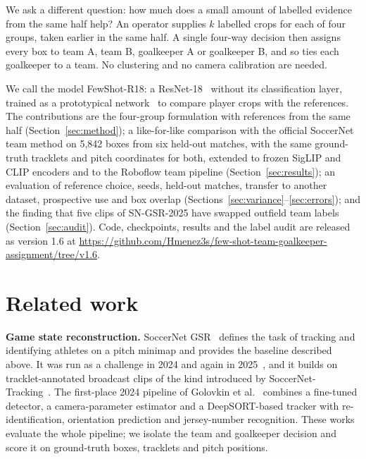 \documentclass[10pt]{article}
\begin{document}
We ask a different question: how much does a small amount of labelled evidence from the same half help? An operator supplies $k$ labelled crops for each of four groups, taken earlier in the same half. A single four-way decision then assigns every box to team A, team B, goalkeeper A or goalkeeper B, and so ties each goalkeeper to a team. No clustering and no camera calibration are needed.

We call the model FewShot-R18: a ResNet-18~\cite{he2016resnet} without its classification layer, trained as a prototypical network~\cite{snell2017prototypical} to compare player crops with the references. The contributions are the four-group formulation with references from the same half (Section~\ref{sec:method}); a like-for-like comparison with the official SoccerNet team method on 5,842 boxes from six held-out matches, with the same ground-truth tracklets and pitch coordinates for both, extended to frozen SigLIP and CLIP encoders and to the Roboflow team pipeline (Section~\ref{sec:results}); an evaluation of reference choice, seeds, held-out matches, transfer to another dataset, prospective use and box overlap (Sections~\ref{sec:variance}--\ref{sec:errors}); and the finding that five clips of SN-GSR-2025 have swapped outfield team labels (Section~\ref{sec:audit}). Code, checkpoints, results and the label audit are released as version 1.6 at \url{https://github.com/Hmenez3s/few-shot-team-goalkeeper-assignment/tree/v1.6}.

\section{Related work}

\textbf{Game state reconstruction.} SoccerNet GSR~\cite{somers2024soccernet} defines the task of tracking and identifying athletes on a pitch minimap and provides the baseline described above. It was run as a challenge in 2024 and again in 2025~\cite{cioppa2024soccernet,giancola2025soccernet}, and it builds on tracklet-annotated broadcast clips of the kind introduced by SoccerNet-Tracking~\cite{cioppa2022tracking}. The first-place 2024 pipeline of Golovkin et al.~\cite{golovkin2025broadcast} combines a fine-tuned detector, a camera-parameter estimator and a DeepSORT-based tracker with re-identification, orientation prediction and jersey-number recognition. These works evaluate the whole pipeline; we isolate the team and goalkeeper decision and score it on ground-truth boxes, tracklets and pitch positions.
\end{document}
